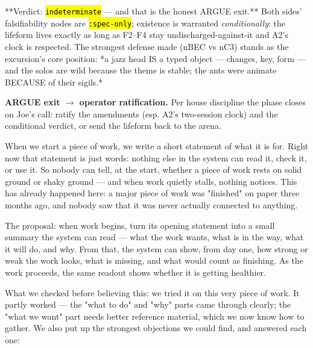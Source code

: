 \documentclass[11pt,oneside]{article}
\newcommand{\scopehl}[1]{\texttt{\hl{#1}}}
\begin{document}
\begin{phasebox}[title={4. ARGUE (2026-06-10) --- the lifeform's self-argument: why should I exist?}]
**Verdict: \scopehl{indeterminate} --- and that is the honest ARGUE exit.** Both sides'
falsifiability nodes are \scopehl{:spec-only}; existence is warranted \emph{conditionally}:
the lifeform lives exactly as long as F2--F4 stay undischarged-against-it and
A2's clock is respected. The strongest defense made (nBEC vs nC3) stands as
the excursion's core position: *a jazz head IS a typed object --- changes, key,
form --- and the solos are wild because the theme is stable; the ants were
animate BECAUSE of their sigils.*

\textbf{ARGUE exit $\rightarrow$ operator ratification.} Per house discipline the phase closes
on Joe's call: ratify the amendments (esp. A2's two-session clock) and the
conditional verdict, or send the lifeform back to the arena.

\begin{subbox}[title={4.1 Plain-language argument (the version anyone can read)}]

When we start a piece of work, we write a short statement of what it is for.
Right now that statement is just words: nothing else in the system can read
it, check it, or use it. So nobody can tell, at the start, whether a piece of
work rests on solid ground or shaky ground --- and when work quietly stalls,
nothing notices. This has already happened here: a major piece of work was
"finished" on paper three months ago, and nobody saw that it was never
actually connected to anything.

The proposal: when work begins, turn its opening statement into a small
summary the system can read --- what the work wants, what is in the way, what
it will do, and why. From that, the system can show, from day one, how strong
or weak the work looks, what is missing, and what would count as finishing.
As the work proceeds, the same readout shows whether it is getting healthier.

What we checked before believing this: we tried it on this very piece of
work. It partly worked --- the "what to do" and "why" parts came through
clearly; the "what we want" part needs better reference material, which we
now know how to gather. We also put up the strongest objections we could
find, and answered each one:


\end{subbox}
\end{phasebox}
\end{document}
